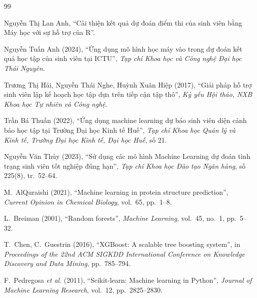 \documentclass[12pt,a4paper,oneside]{report}
\renewcommand{\appendixname}{Phụ lục}%
\newcommand{\tocchapname}{Chương}
\begin{document}
\begin{thebibliography}{99}
\setlength{\itemsep}{2pt}

Nguyễn Thị Lan Anh, ``Cải thiện kết quả dự đoán điểm thi của sinh viên
bằng Máy học với sự hỗ trợ của R''.

Nguyễn Tuấn Anh (2024), ``Ứng dụng mô hình học máy vào trong dự đoán kết
quả học tập của sinh viên tại ICTU'', \textit{Tạp chí Khoa học và Công nghệ
Đại học Thái Nguyên}.

Trương Thị Hải, Nguyễn Thái Nghe, Huỳnh Xuân Hiệp (2017), ``Giải pháp hỗ trợ
sinh viên lập kế hoạch học tập dựa trên tiếp cận tập thô'',
\textit{Kỷ yếu Hội thảo, NXB Khoa học Tự nhiên và Công nghệ}.

Trần Bá Thuấn (2022), ``Ứng dụng machine learning dự báo sinh viên diện cảnh
báo học tập tại Trường Đại học Kinh tế Huế'', \textit{Tạp chí Khoa học Quản
lý và Kinh tế, Trường Đại học Kinh tế, Đại học Huế}, số 21.

Nguyễn Văn Thủy (2023), ``Sử dụng các mô hình Machine Learning dự đoán tình
trạng sinh viên tốt nghiệp đúng hạn'', \textit{Tạp chí Khoa học Đào tạo
Ngân hàng}, số 225(8), tr.~52--64.

M.~AlQuraishi (2021), ``Machine learning in protein structure prediction'',
\textit{Current Opinion in Chemical Biology}, vol.~65, pp.~1--8.

L.~Breiman (2001), ``Random forests'', \textit{Machine Learning}, vol.~45,
no.~1, pp.~5--32.

T.~Chen, C.~Guestrin (2016), ``XGBoost: A scalable tree boosting system'',
in \textit{Proceedings of the 22nd ACM SIGKDD International Conference on
Knowledge Discovery and Data Mining}, pp.~785--794.

F.~Pedregosa \textit{et al.} (2011), ``Scikit-learn: Machine learning in
Python'', \textit{Journal of Machine Learning Research}, vol.~12,
pp.~2825--2830.

\end{thebibliography}

\appendix
\addtocontents{toc}{\protect\renewcommand{\protect\tocchapname}{\appendixname}}
\end{document}
